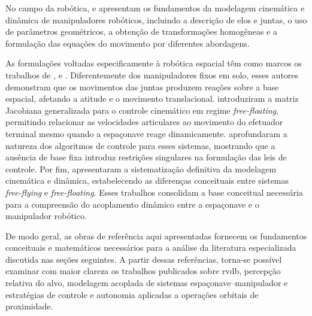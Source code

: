 No campo da robótica, \cite{craig2005} e \cite{sciavicco_siciliano2010} apresentam os fundamentos da modelagem cinemática e dinâmica de manipuladores robóticos, incluindo a descrição de elos e juntas, o uso de parâmetros geométricos, a obtenção de transformações homogêneas e a formulação das equações do movimento por diferentes abordagens.

As formulações voltadas especificamente à robótica espacial têm como marcos os trabalhos de \cite{umetani1989resolved}, \cite{papadopoulos1991nature} e \cite{dubowsky1993kinematics}. 
Diferentemente dos manipuladores fixos em solo, esses autores demonstram que os movimentos das juntas produzem reações sobre a base espacial, afetando a atitude e o movimento translacional. 
\cite{umetani1989resolved} introduziram a matriz Jacobiana generalizada para o controle cinemático em regime \textit{free-floating}, permitindo relacionar as velocidades articulares ao movimento do efetuador terminal mesmo quando a espaçonave reage dinamicamente. 
\cite{papadopoulos1991nature} aprofundaram a natureza dos algoritmos de controle para esses sistemas, mostrando que a ausência de base fixa introduz restrições singulares na formulação das leis de controle. 
Por fim, \cite{dubowsky1993kinematics} apresentaram a sistematização definitiva da modelagem cinemática e dinâmica, estabelecendo as diferenças conceituais entre sistemas \textit{free-flying} e \textit{free-floating}. 
Esses trabalhos consolidam a base conceitual necessária para a compreensão do acoplamento dinâmico entre a espaçonave e o manipulador robótico.

De modo geral, as obras de referência aqui apresentadas fornecem os fundamentos conceituais e matemáticos necessários para a análise da literatura especializada discutida nas seções seguintes. A partir dessas referências, torna-se possível examinar com maior clareza os trabalhos publicados sobre \gls{rvdb}, percepção relativa do alvo, modelagem acoplada de sistemas espaçonave--manipulador e estratégias de controle e autonomia aplicadas a operações orbitais de proximidade.